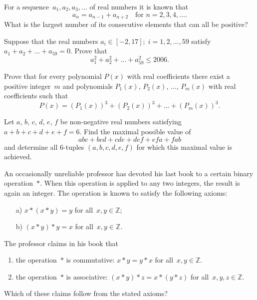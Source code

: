 \documentclass{bw06}
\begin{document}
\maketitle

\begin{problems}

\item
  For a sequence~$a_1, a_2, a_3, \dots$ of real numbers it is known
  that
  \[a_n=a_{n-1}+a_{n+2} \quad \text{for } n=2,3,4,\dots.\]
  What is the largest
  number of its consecutive elements that can all be positive?

\item
  Suppose that the real numbers
$a_i\in[-2, 17];\; i = 1, 2, \dots, 59$
satisfy $a_1+a_2+\dots+a_{59}=0$.
Prove that
\[a_1^2 + a_2^2 + \dots + a_{59}^2 \le 2006.\]

\item
Prove that for every polynomial $P(x)$ with real coefficients
there exist a positive integer~$m$ and polynomials
$P_1(x)$, $P_2(x)$, $\ldots$, $P_m(x)$ with real coefficients
such that
\[P(x)=(P_1(x))^3+(P_2(x))^3+\ldots+(P_m(x))^3.\]

\item
Let $a$, $b$, $c$, $d$, $e$, $f$ be non-negative real
numbers satisfying $a+b+c+d+e+f=6$. Find the maximal possible value of
\[abc+bcd+cde+def+efa+fab\] and determine all $6$-tuples
$(a,b,c,d,e,f)$ for which this maximal value is achieved.

\item An occasionally unreliable professor has devoted his last book to 
a certain binary operation~$*$. When this operation is applied to 
any two integers, the result is again an integer.
The operation is known to satisfy the following axioms:
  \begin{itemize}
    \item[a) ] $x*(x*y)=y$ for all~$x,y \in \mathbb{Z}$;
    \item[b) ] $(x*y)*y=x$ for all~$x,y \in \mathbb{Z}$.
  \end{itemize}
The professor claims in his book that
  \begin{enumerate}
  \item the operation~$*$ is commutative:
    $x*y=y*x$ for all~$x,y \in \mathbb{Z}$.
  \item the operation~$*$ is associative:
    $(x*y)*z=x*(y*z)$ for all~$x,y,z \in \mathbb{Z}$.
  \end{enumerate}
Which of these claims follow from the stated axioms?


\end{problems}
\end{document}
